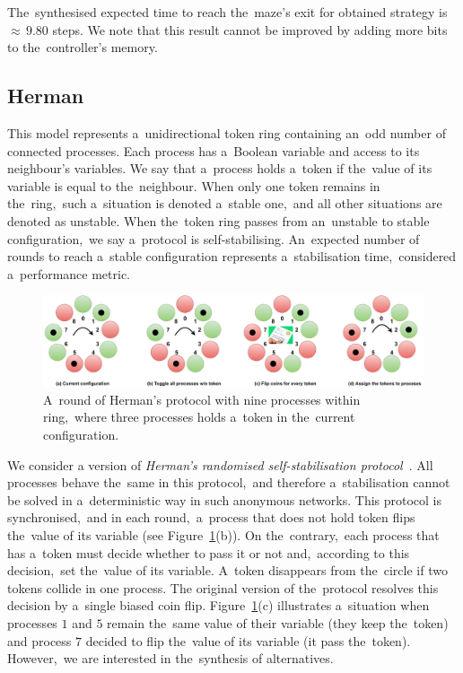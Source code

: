 The~synthesised expected time to reach the~maze's exit for obtained strategy is ${\approx} \, 9.80$ steps. 
We note that this result cannot be improved by adding more bits to the~controller's memory.

\subsection{Herman}
This model represents a~unidirectional token ring containing an~odd number of connected processes.
Each process has a~Boolean variable and access to its neighbour's variables.
We say that a~process holds a~token if the~value of its variable is equal to the~neighbour.
When only one token remains in the~ring,~such a~situation is denoted a~stable one,~and all other situations are denoted as unstable.
When the~token ring passes from an~unstable to stable configuration,~we say a~protocol is self-stabilising.
An~expected number of rounds to reach a~stable configuration represents a~stabilisation time,~considered a~performance metric.

\begin{figure}[h!]
\centering
\includegraphics[width=1.0\textwidth]{figures/herman_coins.pdf}
\caption{A~round of Herman's protocol with nine processes within ring,~where three processes holds a~token in the~current configuration.}%
\label{fig:herman}%
\end{figure}

We consider a version of \textit{Herman's randomised self-stabilisation protocol}~\cite{herman1,herman2}.
All processes behave the~same in this protocol,~and therefore a~stabilisation cannot be solved in a~deterministic way in such anonymous networks.
This protocol is synchronised,~and in each round,~a~process that does not hold token flips the~value of its variable (see Figure~\ref{fig:herman}(b)).
On the~contrary,~each process that has a~token must decide whether to pass it or not and,~according to this decision,~set the~value of its variable.
A~token disappears from the~circle if two tokens collide in one process.
The original version of the~protocol resolves this decision by a~single biased coin flip.
Figure~\ref{fig:herman}(c) illustrates a~situation when processes $1$ and $5$ remain the~same value of their variable (they keep the~token) and process $7$ decided to flip the~value of its variable (it pass the~token).
However,~we are interested in the~synthesis of alternatives.

